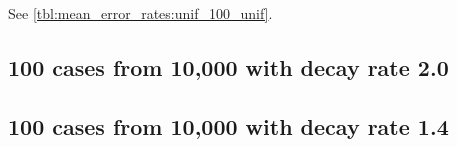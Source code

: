 See \autoref{tbl:mean_error_rates:unif_100_unif}.

\begin{table}[H]
\centering
\scriptsize

    \begin{subtable}{0.5\textwidth}
    
    \caption{Means} 
    \end{subtable}%
    \begin{subtable}{0.5\textwidth}
    
    \caption{Standard deviations} 
    \end{subtable}

\caption{Error rates for uniform population of 10,000, single peak intensity of factor 100 and no decay (uniform)}
\label{tbl:mean_error_rates:unif_100_unif:2}
\end{table}

\subsection{100 cases from 10,000 with decay rate 2.0}
\begin{table}[H]
\centering
\scriptsize

    \begin{subtable}{0.5\textwidth}
    
    \caption{Means} 
    \end{subtable}%
    \begin{subtable}{0.5\textwidth}
    
    \caption{Standard deviations} 
    \end{subtable}

\caption{Error rates for uniform population of 10,000, single peak intensity of factor 100 and decay rate 2.0}
\label{tbl:mean_error_rates:unif_100_2_1h}
\end{table}

\subsection{100 cases from 10,000 with decay rate 1.4}
\begin{table}[H]
\centering
\scriptsize

    \begin{subtable}{0.5\textwidth}
    
    \caption{Means} 
    \end{subtable}%
    \begin{subtable}{0.5\textwidth}
    
    \caption{Standard deviations} 
    \end{subtable}

\caption{Error rates for uniform population of 10,000, single peak intensity of factor 100 and decay rate 1.4}
\label{tbl:mean_error_rates:unif_100_1.4_1h}
\end{table}

